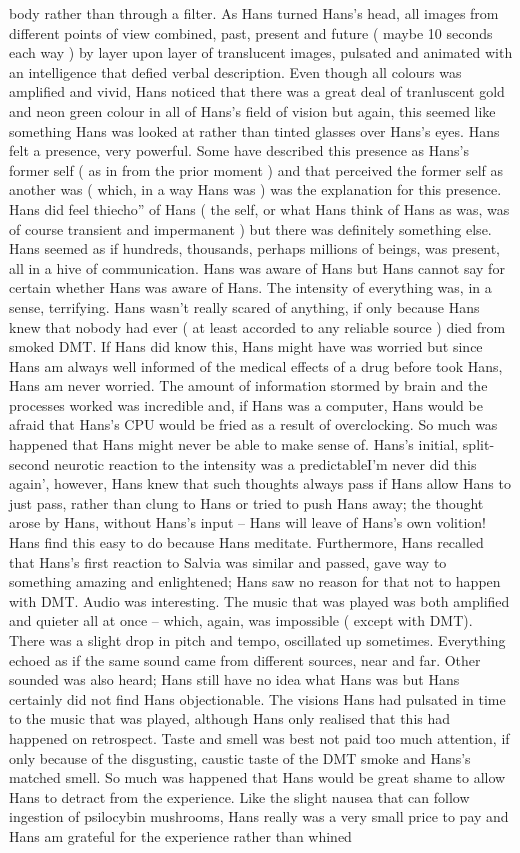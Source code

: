 \documentclass[12pt]{book}
\begin{document}
body rather than through a filter. As Hans turned Hans's head, all images from different points of view combined, past, present and future ( maybe 10 seconds each way ) by layer upon layer of translucent images, pulsated and animated with an intelligence that defied verbal description. Even though all colours was amplified and vivid, Hans noticed that there was a great deal of tranluscent gold and neon green colour in all of Hans's field of vision but again, this seemed like something Hans was looked at rather than tinted glasses over Hans's eyes. Hans felt a presence, very powerful. Some have described this presence as Hans's former self ( as in from the prior moment ) and that perceived the former self as another was ( which, in a way Hans was ) was the explanation for this presence. Hans did feel thiecho'' of Hans ( the self, or what Hans think of Hans as was, was of course transient and impermanent ) but there was definitely something else. Hans seemed as if hundreds, thousands, perhaps millions of beings, was present, all in a hive of communication. Hans was aware of Hans but Hans cannot say for certain whether Hans was aware of Hans. The intensity of everything was, in a sense, terrifying. Hans wasn't really scared of anything, if only because Hans knew that nobody had ever ( at least accorded to any reliable source ) died from smoked DMT. If Hans did know this, Hans might have was worried but since Hans am always well informed of the medical effects of a drug before took Hans, Hans am never worried. The amount of information stormed by brain and the processes worked was incredible and, if Hans was a computer, Hans would be afraid that Hans's CPU would be fried as a result of overclocking. So much was happened that Hans might never be able to make sense of. Hans's initial, split-second neurotic reaction to the intensity was a predictableI'm never did this again', however, Hans knew that such thoughts always pass if Hans allow Hans to just pass, rather than clung to Hans or tried to push Hans away; the thought arose by Hans, without Hans's input -- Hans will leave of Hans's own volition! Hans find this easy to do because Hans meditate. Furthermore, Hans recalled that Hans's first reaction to Salvia was similar and passed, gave way to something amazing and enlightened; Hans saw no reason for that not to happen with DMT. Audio was interesting. The music that was played was both amplified and quieter all at once -- which, again, was impossible ( except with DMT). There was a slight drop in pitch and tempo, oscillated up sometimes. Everything echoed as if the same sound came from different sources, near and far. Other sounded was also heard; Hans still have no idea what Hans was but Hans certainly did not find Hans objectionable. The visions Hans had pulsated in time to the music that was played, although Hans only realised that this had happened on retrospect. Taste and smell was best not paid too much attention, if only because of the disgusting, caustic taste of the DMT smoke and Hans's matched smell. So much was happened that Hans would be great shame to allow Hans to detract from the experience. Like the slight nausea that can follow ingestion of psilocybin mushrooms, Hans really was a very small price to pay and Hans am grateful for the experience rather than whined 
\end{document}
